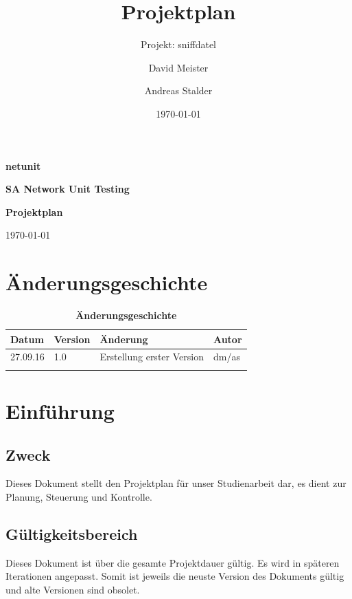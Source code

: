 \documentclass[a4,12pt]{scrartcl}
\title{Projektplan}
\subtitle{Projekt: sniffdatel}
\author{David Meister \and Andreas Stalder}
\date{\today}
\begin{document}
\begin{titlepage}
	\centering
	\vspace{5cm}
	\begin{center}
	\end{center}
	{\huge\bfseries netunit\par}
	\vspace{8cm}
	\raggedright
	{\bfseries SA Network Unit Testing\par}
	{\huge\bfseries Projektplan\par}
	\vspace{1cm}
	{\theauthor \par}
	{\today\par}

\end{titlepage}

\section{Änderungsgeschichte}

\begin{table}[htb]
\centering
    \begin{tabular}{@{} l l l l@{}}\toprule    
    {Datum} & {Version} & {Änderung} & {Autor}\\ \midrule
    27.09.16 & 1.0 & Erstellung erster Version & dm/as\\ \addlinespace
    \end{tabular}
\caption{\textbf{Änderungsgeschichte}}
\end{table}

\newpage

\tableofcontents
\newpage


\section{Einführung}
\subsection{Zweck}
Dieses Dokument stellt den Projektplan für unser Studienarbeit dar, es dient zur Planung, Steuerung und Kontrolle.
\subsection{Gültigkeitsbereich}
Dieses Dokument ist über die gesamte Projektdauer gültig. Es wird in späteren Iterationen angepasst. Somit ist jeweils die neuste Version des Dokuments gültig und alte Versionen sind obsolet.
\end{document}
